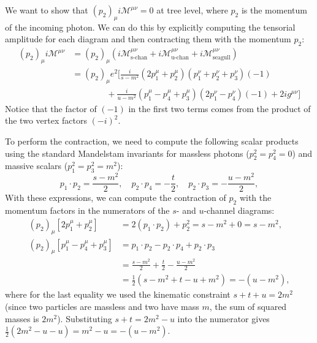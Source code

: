 We want to show that \((p_2)_\mu i \mathcal{M}^{\mu \nu} = 0\) at tree level, where \(p_2\) is the momentum of the incoming photon. We can do this by explicitly computing the tensorial amplitude for each diagram and then contracting them with the momentum $p_2$:
\[
    \begin{aligned}
        (p_2)_\mu i \mathcal{M}^{\mu \nu} & = (p_2)_\mu \left( i\mathcal{M}^{\mu\nu}_{\text{s-chan}} + i\mathcal{M}^{\mu\nu}_{\text{u-chan}} + i\mathcal{M}^{\mu\nu}_{\text{seagull}} \right) \\
                                          & = (p_2)_\mu e^2 \Bigg[ \frac{i}{s-m^2} (2p_1^\mu + p_2^\mu)(p_1^\nu + p_2^\nu + p_3^\nu)(-1)                                                      \\
                                          & \qquad \qquad + \frac{i}{u-m^2} (p_1^\mu - p_4^\mu + p_3^\mu)(2p_1^\nu - p_4^\nu)(-1) + 2i g^{\mu\nu} \Bigg]
    \end{aligned}
\]
Notice that the factor of $(-1)$ in the first two terms comes from the product of the two vertex factors $(-i)^2$.

To perform the contraction, we need to compute the following scalar products using the standard Mandelstam invariants for massless photons ($p_2^2 = p_4^2 = 0$) and massive scalars ($p_1^2 = p_3^2 = m^2$):
\[
    p_1 \cdot p_2 = \frac{s - m^2}{2}, \quad p_2 \cdot p_4 = -\frac{t}{2}, \quad p_2 \cdot p_3 = - \frac{u - m^2}{2},
\]
With these expressions, we can compute the contraction of $p_2$ with the momentum factors in the numerators of the $s$- and $u$-channel diagrams:
\[
    \begin{aligned}
        (p_2)_\mu [2p_1^{\mu} + p_2^{\mu}]            & = 2(p_1 \cdot p_2) + p_2^2 = s - m^2 + 0 = s - m^2,   \\
        (p_2)_\mu [p_1^{\mu} - p_4^{\mu} + p_3^{\mu}] & = p_1 \cdot p_2 - p_2 \cdot p_4 + p_2 \cdot p_3       \\
                                                      & = \frac{s - m^2}{2} + \frac{t}{2} - \frac{u - m^2}{2} \\
                                                      & = \frac{1}{2} (s - m^2 + t - u + m^2) = - (u - m^2),
    \end{aligned}
\]
where for the last equality we used the kinematic constraint \(s + t + u = 2 m^2\) (since two particles are massless and two have mass $m$, the sum of squared masses is $2m^2$). Substituting $s+t = 2m^2 - u$ into the numerator gives $\frac{1}{2}(2m^2 - u - u) = m^2 - u = -(u - m^2)$.


